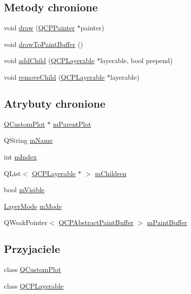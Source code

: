 \subsection*{Metody chronione}
\begin{DoxyCompactItemize}
\item 
void \hyperlink{class_q_c_p_layer_ab831a99c8d30b15ec4533ca341e8813b}{draw} (\hyperlink{class_q_c_p_painter}{Q\+C\+P\+Painter} $\ast$painter)
\item 
void \hyperlink{class_q_c_p_layer_a4a8e0a86f31462299e7fc8e8158dd2c6}{draw\+To\+Paint\+Buffer} ()
\item 
void \hyperlink{class_q_c_p_layer_a57ce5e49364aa9122276d5df3b4a0ddc}{add\+Child} (\hyperlink{class_q_c_p_layerable}{Q\+C\+P\+Layerable} $\ast$layerable, bool prepend)
\item 
void \hyperlink{class_q_c_p_layer_ac2f64ac7761650582d968d86670ef362}{remove\+Child} (\hyperlink{class_q_c_p_layerable}{Q\+C\+P\+Layerable} $\ast$layerable)
\end{DoxyCompactItemize}
\subsection*{Atrybuty chronione}
\begin{DoxyCompactItemize}
\item 
\hyperlink{class_q_custom_plot}{Q\+Custom\+Plot} $\ast$ \hyperlink{class_q_c_p_layer_a2f3374a7884bf403720cd1cf6f7ad1bb}{m\+Parent\+Plot}
\item 
Q\+String \hyperlink{class_q_c_p_layer_a91e6298183cb4b9dfd4efdfaf1ecc220}{m\+Name}
\item 
int \hyperlink{class_q_c_p_layer_a122088bcab6cec76a52b75ce8606605b}{m\+Index}
\item 
Q\+List$<$ \hyperlink{class_q_c_p_layerable}{Q\+C\+P\+Layerable} $\ast$ $>$ \hyperlink{class_q_c_p_layer_a704aa71bba469383c3a3c598c1ec0d28}{m\+Children}
\item 
bool \hyperlink{class_q_c_p_layer_a264950deb08e589460c126c895a1e2b5}{m\+Visible}
\item 
\hyperlink{class_q_c_p_layer_a67dcfc1590be2a1f2227c5a39bb59c7c}{Layer\+Mode} \hyperlink{class_q_c_p_layer_a11bd0aa190d8fa21c8c7673d070737c8}{m\+Mode}
\item 
Q\+Weak\+Pointer$<$ \hyperlink{class_q_c_p_abstract_paint_buffer}{Q\+C\+P\+Abstract\+Paint\+Buffer} $>$ \hyperlink{class_q_c_p_layer_aa0bdbc75e4350a0669ff515b3476a3d3}{m\+Paint\+Buffer}
\end{DoxyCompactItemize}
\subsection*{Przyjaciele}
\begin{DoxyCompactItemize}
\item 
class \hyperlink{class_q_c_p_layer_a1cdf9df76adcfae45261690aa0ca2198}{Q\+Custom\+Plot}
\item 
class \hyperlink{class_q_c_p_layer_ad655f55cccf49ba14d5172ec517e07ae}{Q\+C\+P\+Layerable}
\end{DoxyCompactItemize}



